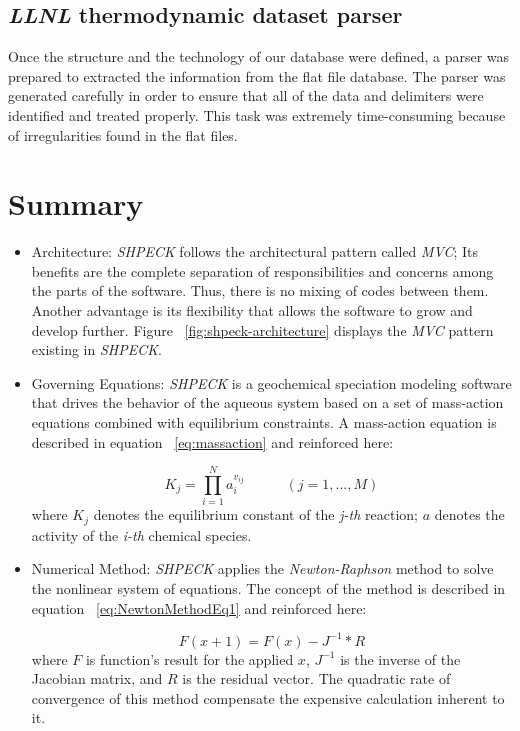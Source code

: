 \subsection{\emph{LLNL} thermodynamic dataset parser}
Once the structure and the technology of our database were defined, a parser was prepared to extracted the information from the flat file database. 
The parser was generated carefully in order to ensure that all of the data and delimiters were identified and treated properly. This task was extremely time-consuming because of irregularities found in the flat files.

\newpage

\section{Summary}
\begin{itemize}
\item Architecture: \emph{SHPECK} follows the architectural pattern called \emph{MVC}; Its benefits are the complete separation of responsibilities and concerns among the parts of the software. Thus, there is no mixing of codes between them. Another advantage is its flexibility that allows the software to grow and develop further. Figure ~\ref{fig:shpeck-architecture} displays the \emph{MVC} pattern existing in \emph{SHPECK}.
\item Governing Equations: \emph{SHPECK} is a geochemical speciation modeling software that drives the behavior of the aqueous system based on a set of mass-action equations combined with equilibrium constraints. A mass-action equation is described in equation  ~\ref{eq:massaction} and reinforced here:

\begin{equation}
K_j =  \prod\limits_{i=1}^N  a_i^{v_{ij}} \hspace{35pt}    (j = 1, ... , M)
\end{equation}
where $K_j$ denotes the equilibrium constant of the \emph{j-th} reaction; $a$ denotes the activity of the \emph{i-th} chemical species.

\item Numerical Method: \emph{SHPECK} applies the \emph{Newton-Raphson} method to solve the nonlinear system of equations. The concept of the method is described in equation ~\ref{eq:NewtonMethodEq1} and reinforced here:

\begin{equation}
F(x+1) = F(x) - J^{-1} * R
\end{equation}
where $F$ is function's result for the applied $x$, $J^{-1}$ is the inverse of the Jacobian matrix, and $R$ is the residual vector. The quadratic rate of convergence of this method compensate the expensive calculation inherent to it.


\end{itemize}
